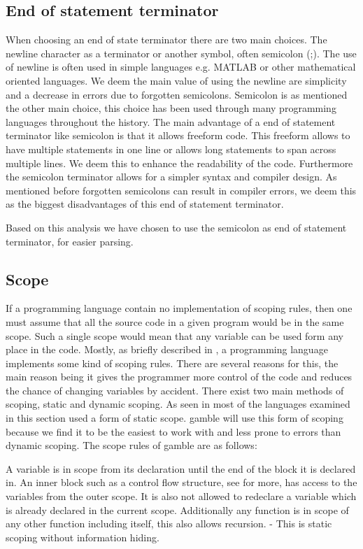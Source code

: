 \subsection*{End of statement terminator}
When choosing an end of state terminator there are two main choices.
The newline character as a terminator or another symbol, often semicolon (;).
The use of newline is often used in simple languages e.g. MATLAB or other mathematical oriented languages. 
We deem the main value of using the newline are simplicity and a decrease in errors due to forgotten semicolons.
Semicolon is as mentioned the other main choice, this choice has been used through many programming languages throughout the history. 
The main advantage of a end of statement terminator  like semicolon is that it allows freeform code. 
This freeform allows to have multiple statements in one line or allows long statements to span across multiple lines.
We deem this to enhance the readability of the code.
Furthermore the semicolon terminator allows for a simpler syntax and compiler design.
As mentioned before forgotten semicolons can result in compiler errors, we deem this as the biggest disadvantages of this end of statement terminator.

Based on this analysis we have chosen to use the semicolon as end of statement terminator, for easier parsing.

\subsection*{Scope}
If a programming language contain no implementation of scoping rules, then one must assume that all the source code in a given program would be in the same scope.
Such a single scope would mean that any variable can be used form any place in the code. 
Mostly, as briefly described in , a programming language implements some kind of scoping rules.
There are several reasons for this, the main reason being it gives the programmer more control of the code and reduces the chance of changing variables by accident.
There exist two main methods of scoping, static and dynamic scoping.
As seen in  most of the languages examined in this section used a form of static scope. 
\gls{gamble} will use this form of scoping because we find it to be the easiest to work with and less prone to errors than dynamic scoping.
The scope rules of \gls{gamble} are as follows:

A variable is in scope from its declaration until the end of the block it is declared in.
An inner block such as a control flow structure, see  for more, has access to the variables from the outer scope. 
It is also not allowed to redeclare a variable which is already declared in the current scope. 
Additionally any function is in scope of any other function including itself, this also allows recursion. 
- This is static scoping without information hiding. 

